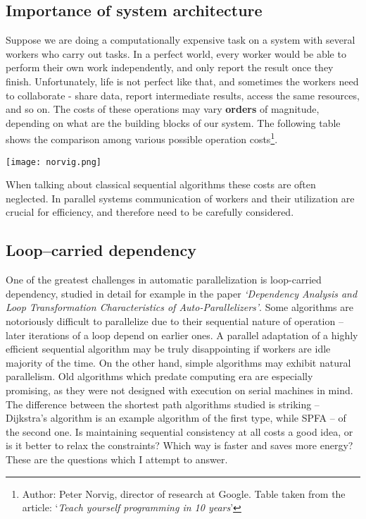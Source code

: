 \documentclass[12pt,a4paper,oneside,openright]{report}
\begin{document}
\subsection{Importance of system architecture} 
Suppose we are doing a computationally expensive task on a system with several workers who carry out tasks. In a perfect world, every worker would be able to perform their own work independently, and only report the result once they finish. Unfortunately, life is not perfect like that, and sometimes the workers need to collaborate - share data, report intermediate results, access the same resources, and so on. The costs of these operations may vary \textbf{orders} of magnitude, depending on what are the building blocks of our system. The following table shows the comparison among various possible operation costs\footnote{Author: Peter Norvig, director of research at Google. Table taken from the article: `\textit{Teach yourself programming in 10 years}'}.
\begin{center}
\texttt{[image: norvig.png]}
\end{center}

When talking about classical sequential algorithms these costs are often neglected. In parallel systems communication of workers and their utilization are crucial for efficiency, and therefore need to be carefully considered.

\subsection{Loop--carried dependency}
One of the greatest challenges in automatic parallelization is loop-carried dependency, studied in detail for example in the paper \textit{`Dependency Analysis and Loop Transformation Characteristics of Auto-Parallelizers'}\cite{loop-carried}. Some algorithms are notoriously difficult to parallelize due to their sequential nature of operation -- later iterations of a loop depend on earlier ones. A parallel adaptation of a highly efficient sequential algorithm may be truly disappointing if workers are idle majority of the time. On the other hand, simple algorithms may exhibit natural parallelism. Old algorithms which predate computing era are especially promising, as they were not designed with execution on serial machines in mind. The difference between the shortest path algorithms studied is striking -- Dijkstra's algorithm is an example algorithm of the first type, while SPFA -- of the second one. Is maintaining sequential consistency at all costs a good idea, or is it better to relax the constraints? Which way is faster and saves more energy? These are the questions which I attempt to answer.
\end{document}
